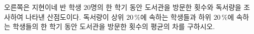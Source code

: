 \noindent\begin{minipage}[t]{0.58\linewidth}\vspace{0pt}\raggedright 오른쪽은 지현이네 반 학생 $20$명의 한 학기 동안 도서관을 방문한 횟수와 독서량을 조사하여 나타낸 산점도이다. 독서량이 상위 $20\,\%$에 속하는 학생들과 하위 $20\,\%$에 속하는 학생들의 한 학기 동안 도서관을 방문한 횟수의 평균의 차를 구하시오.\end{minipage}\hfill\begin{minipage}[t]{0.4\linewidth}\vspace{0pt}\centering \resizebox{\ifdim\width>\linewidth\linewidth\else\width\fi}{!}{}\end{minipage}\par
